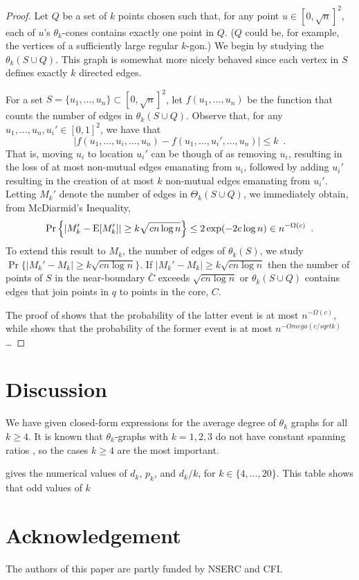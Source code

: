 \documentclass{patmorin}
\begin{document}
\begin{proof}
Let $Q$ be a set of $k$ points chosen such that, for any point
$u\in[0,\sqrt{n}]^2$, each of $u$'s $\theta_k$-cones contains exactly one
point in $Q$. ($Q$ could be, for example, the vertices of a sufficiently
large regular $k$-gon.)  We begin by studying the $\theta_k(S\cup Q)$.
This graph is somewhat more nicely behaved since each vertex in $S$
defines exactly $k$ directed edges.

For a set $S=\{u_1,\ldots,u_n\}\subset [0,\sqrt{n}]^2$,
let $f(u_1,\ldots,u_n)$ be the function that counts the number of edges
in $\theta_k(S\cup Q)$.  Observe that, for any $u_1,\ldots,u_n,u_i'\in
[0,1]^2$, we have that
\[
   |f(u_1,\ldots,u_i,\ldots,u_n)-f(u_1,\ldots,u_i',\ldots,u_n)| \le k \enspace .
\]
That is, moving $u_i$ to location $u_i'$ can be though of as removing
$u_i$, resulting in the loss of at most non-mutual edges emanating from
$u_i$, followed by adding $u_i'$ resulting in the creation of at most $k$
non-mutual edges emanating from $u_i'$.  Letting $M_k'$ denote the number
of edges in $\Theta_k(S\cup Q)$, we immediately obtain, from McDiarmid's Inequality,
\[
   \Pr\left\{\left|M_k'-\mathrm{E}[M_k']\right| \ge k\sqrt{cn\log n}\right\} 
       \le 2\exp(-2c\log n) 
       \in n^{-\Omega(c)} \enspace .
\]
To extend this result to $M_k$, the number of edges of $\theta_k(S)$,
we study $\Pr\{|M_k' - M_k|\ge k\sqrt{cn\log n}\}$.  If $|M_k' - M_k|\ge
k\sqrt{cn\log n}$ then the number of points of $S$ in the near-boundary
$\bar{C}$ exceeds $\sqrt{cn\log n}$ or $\theta_k(S\cup Q)$ contains
edges that join points in $q$ to points in the core, $C$.

The proof of  shows that
the probability of the latter event is at most $n^{-\Omega(c)}$,
while  shows that the probability of the former event
is at most $n^{-Omega(c/sqrt{k})}$\ldots


\end{proof}





\section{Discussion}

We have given closed-form expressions for the average degree of $\theta_k$
graphs for all $k\ge 4$.  It is known that $\theta_k$-graphs with
$k=1,2,3$ do not have constant spanning ratios \cite{S}, so the cases
$k\ge 4$ are the most important.

 gives the numerical values of $d_k$, $p_k$, and $d_k/k$,
for $k\in\{4,\ldots,20\}$.  This table shows that odd values of $k$

\section*{Acknowledgement}

The authors of this paper are partly funded by NSERC and CFI.



\end{document}
